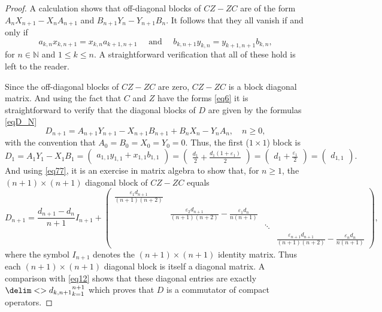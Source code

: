 \documentclass[10pt,reqno]{amsart}
\theoremstyle{remark}
\newcommand{\seq}{\delim<>}
\numberwithin{equation}{section}
\begin{document}
\begin{proof}
  A calculation shows that off-diagonal blocks of $CZ-ZC$ are of the form $A_nX_{n+1}-X_nA_{n+1}$ and $B_{n+1}Y_n-Y_{n+1}B_n$.
  It follows that they all vanish if and only if
  \begin{equation}
    \label{eq2new} a_{k,n}x_{k,n+1}=x_{k,n}a_{k+1,n+1}\quad\mbox{ and }\quad
    b_{k,n+1}y_{k,n}=y_{k+1,n+1}b_{k,n},
  \end{equation}
  for $n\in\mathbb{N}$ and $1\le k\le n$.
  A straightforward verification that all of these hold is left to the reader.



  Since the off-diagonal blocks of $CZ-ZC$ are zero, $CZ-ZC$ is a block diagonal matrix.
  And using the fact that $C$ and $Z$ have the forms \eqref{eq6} it is straightforward to verify that the diagonal  blocks of $D$ are given by the formulas \eqref{eqD_N}
  \begin{equation}
    \label{eq77}
    D_{n+1}=A_{n+1}Y_{n+1}-X_{n+1}B_{n+1}+B_nX_n-Y_nA_n,\quad n\ge 0,
  \end{equation}
  with the convention that $A_0=B_0=X_0=Y_0=0$.
  Thus, the first ($1\times 1$) block is
  \begin{equation}
    \label{eq3new}
    D_1=A_1Y_1-X_1B_1=\begin{pmatrix} a_{1,1}y_{1,1}+x_{1,1}b_{1,1} \end{pmatrix}=
    \begin{pmatrix} \frac{d_1}{2}+\frac{d_1(1+\varepsilon_1)}{2} \end{pmatrix}
    =\begin{pmatrix} d_1+\frac{\varepsilon_1}{2} \end{pmatrix}=\begin{pmatrix} d_{1,1} \end{pmatrix}.
  \end{equation}
  And using \eqref{eq77}, it is an exercise in matrix algebra to show that, for $n\ge 1$, the $(n+1)\times (n+1)$ diagonal block of $CZ-ZC$ equals
  \begin{equation*}
    D_{n+1}=
    \frac{d_{n+1}-d_n}{n+1} I_{n+1}+
    \begin{pmatrix}
      \frac{\varepsilon_1 d_{n+1}}{(n+1)(n+2)}&&&\\&\frac{\varepsilon_2 d_{n+1}}{(n+1)(n+2)}-\frac{\varepsilon_1 d_n}{n(n+1)}&&\\&&\ddots&\\&&&\frac{\varepsilon_{n+1} d_{n+1}}{(n+1)(n+2)}-\frac{\varepsilon_n d_n}{n(n+1)}
    \end{pmatrix},
  \end{equation*}
  where the symbol $I_{n+1}$ denotes the $(n+1)\times(n+1)$ identity matrix.
  Thus each $(n+1)\times (n+1)$ diagonal block  is itself a diagonal matrix.
  A comparison with \eqref{eq12} shows that these diagonal entries are exactly $\seq{d_{k,n+1}}_{k=1}^{n+1}$ which proves that $D$ is a commutator of compact operators.


\end{proof}
\end{document}
